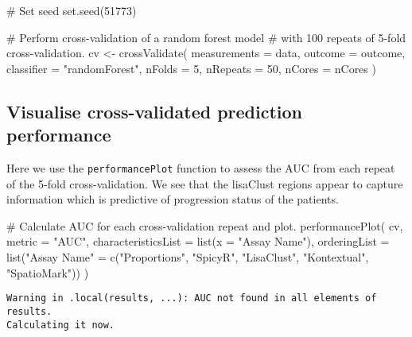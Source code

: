 \documentclass[
  letterpaper,
  DIV=11,
  numbers=noendperiod]{scrreprt}
\newenvironment{Shaded}{\begin{snugshade}}{\end{snugshade}}
\newcommand{\AttributeTok}[1]{\textcolor[rgb]{0.40,0.45,0.13}{#1}}
\newcommand{\CommentTok}[1]{\textcolor[rgb]{0.37,0.37,0.37}{#1}}
\newcommand{\DecValTok}[1]{\textcolor[rgb]{0.68,0.00,0.00}{#1}}
\newcommand{\FunctionTok}[1]{\textcolor[rgb]{0.28,0.35,0.67}{#1}}
\newcommand{\NormalTok}[1]{\textcolor[rgb]{0.00,0.23,0.31}{#1}}
\newcommand{\OtherTok}[1]{\textcolor[rgb]{0.00,0.23,0.31}{#1}}
\newcommand{\StringTok}[1]{\textcolor[rgb]{0.13,0.47,0.30}{#1}}
\begin{document}
\begin{Shaded}
\begin{Highlighting}[]
\CommentTok{\# Set seed}
\FunctionTok{set.seed}\NormalTok{(}\DecValTok{51773}\NormalTok{)}

\CommentTok{\# Perform cross{-}validation of a random forest model}
\CommentTok{\# with 100 repeats of 5{-}fold cross{-}validation.}
\NormalTok{cv }\OtherTok{\textless{}{-}} \FunctionTok{crossValidate}\NormalTok{(}
  \AttributeTok{measurements =}\NormalTok{ data,}
  \AttributeTok{outcome =}\NormalTok{ outcome,}
  \AttributeTok{classifier =} \StringTok{"randomForest"}\NormalTok{,}
  \AttributeTok{nFolds =} \DecValTok{5}\NormalTok{,}
  \AttributeTok{nRepeats =} \DecValTok{50}\NormalTok{,}
  \AttributeTok{nCores =}\NormalTok{ nCores}
\NormalTok{)}
\end{Highlighting}
\end{Shaded}

\subsection{Visualise cross-validated prediction
performance}\label{visualise-cross-validated-prediction-performance}

Here we use the \texttt{performancePlot} function to assess the AUC from
each repeat of the 5-fold cross-validation. We see that the lisaClust
regions appear to capture information which is predictive of progression
status of the patients.

\begin{Shaded}
\begin{Highlighting}[]
\CommentTok{\# Calculate AUC for each cross{-}validation repeat and plot.}
\FunctionTok{performancePlot}\NormalTok{(}
\NormalTok{  cv,}
  \AttributeTok{metric =} \StringTok{"AUC"}\NormalTok{,}
  \AttributeTok{characteristicsList =} \FunctionTok{list}\NormalTok{(}\AttributeTok{x =} \StringTok{"Assay Name"}\NormalTok{),}
  \AttributeTok{orderingList =} \FunctionTok{list}\NormalTok{(}\StringTok{"Assay Name"} \OtherTok{=} \FunctionTok{c}\NormalTok{(}\StringTok{"Proportions"}\NormalTok{, }\StringTok{"SpicyR"}\NormalTok{, }\StringTok{"LisaClust"}\NormalTok{, }\StringTok{"Kontextual"}\NormalTok{, }\StringTok{"SpatioMark"}\NormalTok{))}
\NormalTok{)}
\end{Highlighting}
\end{Shaded}

\begin{verbatim}
Warning in .local(results, ...): AUC not found in all elements of results.
Calculating it now.
\end{verbatim}
\end{document}
